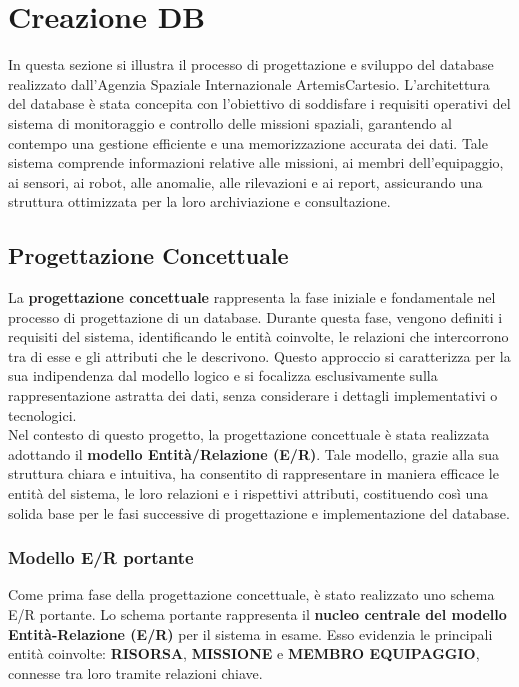 \section{Creazione DB}
In questa sezione si illustra il processo di progettazione e sviluppo del database realizzato dall'Agenzia Spaziale Internazionale ArtemisCartesio. L'architettura del database è stata concepita con l'obiettivo di soddisfare i requisiti operativi del sistema di monitoraggio e controllo delle missioni spaziali, garantendo al contempo una gestione efficiente e una memorizzazione accurata dei dati. Tale sistema comprende informazioni relative alle missioni, ai membri dell'equipaggio, ai sensori, ai robot, alle anomalie, alle rilevazioni e ai report, assicurando una struttura ottimizzata per la loro archiviazione e consultazione.

\subsection{Progettazione Concettuale}

La \textbf{progettazione concettuale} rappresenta la fase iniziale e fondamentale nel processo di progettazione di un database. Durante questa fase, vengono definiti i requisiti del sistema, identificando le entità coinvolte, le relazioni che intercorrono tra di esse e gli attributi che le descrivono. Questo approccio si caratterizza per la sua indipendenza dal modello logico e si focalizza esclusivamente sulla rappresentazione astratta dei dati, senza considerare i dettagli implementativi o tecnologici.\\
Nel contesto di questo progetto, la progettazione concettuale è stata realizzata adottando il \textbf{modello Entità/Relazione (E/R)}. Tale modello, grazie alla sua struttura chiara e intuitiva, ha consentito di rappresentare in maniera efficace le entità del sistema, le loro relazioni e i rispettivi attributi, costituendo così una solida base per le fasi successive di progettazione e implementazione del database.

\subsubsection{Modello E/R portante}

Come prima fase della progettazione concettuale, è stato realizzato uno schema E/R portante. Lo schema portante rappresenta il \textbf{nucleo centrale del modello Entità-Relazione (E/R)} per il sistema in esame. Esso evidenzia le principali entità coinvolte: \textbf{RISORSA}, \textbf{MISSIONE} e \textbf{MEMBRO EQUIPAGGIO}, connesse tra loro tramite relazioni chiave.

